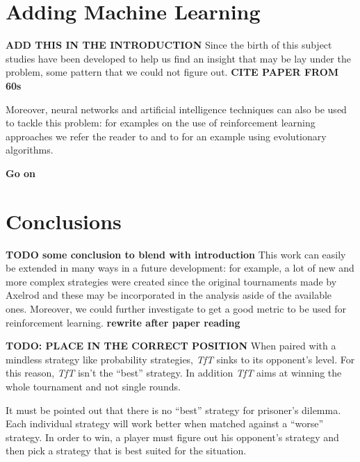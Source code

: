 \documentclass[journal,a4paper,10pt,twoside]{IEEEtran} %
\begin{document}
\section{Adding Machine Learning}
\textbf{ADD THIS IN THE INTRODUCTION}
Since the birth of this subject studies have been developed to help us find an insight that may be lay under the problem, some pattern that we could not figure out. \textbf{CITE PAPER FROM 60s}

Moreover, neural networks and artificial intelligence techniques can also be used to tackle this problem: for examples on the use of reinforcement learning approaches we refer the reader to \cite{sandholmRL,plosRLdominant,coopSeqRL,kedaoRL} and to \cite{shashiEvoAlg} for an example using evolutionary algorithms.

\textbf{Go on}


\section{Conclusions} \label{s:conc}
\textbf{TODO some conclusion to blend with introduction}
This work can easily be extended in many ways in a future development: for example, a lot of new and more complex strategies were created since the original tournaments made by Axelrod and these may be incorporated in the analysis aside of the available ones.
Moreover, we could further investigate to get a good metric to be used for reinforcement learning. \textbf{rewrite after paper reading}

\textbf{TODO: PLACE IN THE CORRECT POSITION}
When paired with a mindless strategy like probability strategies, \textit{TfT} sinks to its opponent's level. For this reason, \textit{TfT} isn't the ``best'' strategy. In addition \textit{TfT} aims at winning the whole tournament and not single rounds.

It must be pointed out that there is no ``best'' strategy for prisoner's dilemma. Each individual strategy will work better when matched against a ``worse'' strategy. In order to win, a player must figure out his opponent's strategy and then pick a strategy that is best suited for the situation.

\balance


\end{document}
